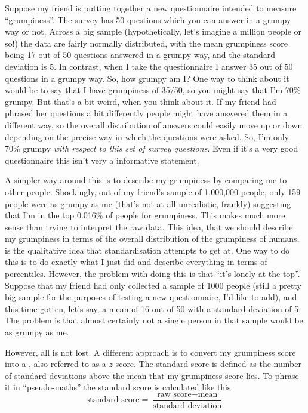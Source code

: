 Suppose my friend is putting together a new questionnaire intended to measure ``grumpiness''. The survey has 50 questions which you can answer in a grumpy way or not. Across a big sample (hypothetically, let's imagine a million people or so!) the data are fairly normally distributed, with the mean grumpiness score being 17 out of 50 questions answered in a grumpy way, and the standard deviation is 5. In contrast, when I take the questionnaire I answer 35 out of 50 questions in a grumpy way. So, how grumpy am I? One way to think about it would be to say that I have grumpiness of 35/50, so you might say that I'm 70\% grumpy. But that's a bit weird, when you think about it. If my friend had phrased her questions a bit differently people might have answered them in a different way, so the overall distribution of answers could easily move up or down depending on the precise way in which the questions were asked. So, I'm only 70\% grumpy {\it with respect to this set of survey questions}. Even if it's a very good questionnaire this isn't very a informative statement. 

A simpler way around this is to describe my grumpiness by comparing me to other people. Shockingly, out of my friend's sample of 1,000,000 people, only 159 people were as grumpy as me (that's not at all unrealistic, frankly) suggesting that I'm in the top 0.016\% of people for grumpiness. This makes much more sense than trying to interpret the raw data. This idea, that we should describe my grumpiness in terms of the overall distribution of the grumpiness of humans, is the qualitative idea that standardisation attempts to get at. One way to do this is to do exactly what I just did and describe everything in terms of percentiles. However, the problem with doing this is that ``it's lonely at the top''. Suppose that my friend had only collected a sample of 1000 people (still a pretty big sample for the purposes of testing a new questionnaire, I'd like to add), and this time gotten, let's say, a mean of 16 out of 50 with a standard deviation of 5. The problem is that almost certainly not a single person in that sample would be as grumpy as me.

However, all is not lost. A different approach is to convert my grumpiness score into a , also referred to as a $z$-score. The standard score is defined as the number of standard deviations above the mean that my grumpiness score lies. To phrase it in ``pseudo-maths'' the standard score is calculated like this:
$$
\mbox{standard score} = \frac{\mbox{raw score} - \mbox{mean}}{\mbox{standard deviation}}
$$ 


